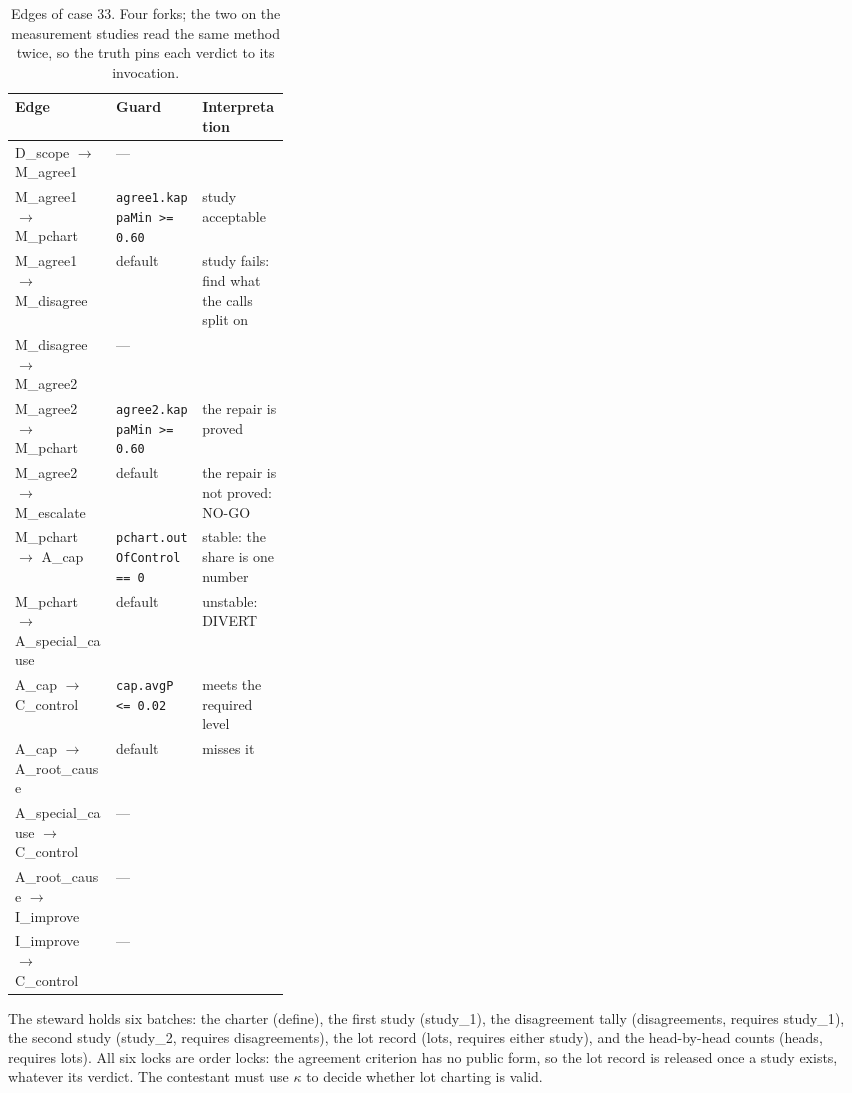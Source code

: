 \documentclass{article}
\begin{document}
\begin{table}[!htbp]
\caption{Edges of case 33. Four forks; the two on the measurement studies read the
same method twice, so the truth pins each verdict to its invocation.}
\label{tab:c33-edges}
\centering
\footnotesize
\begin{tabular}{@{}llP{0.32\linewidth}@{}}
\toprule
Edge & Guard & Interpretation \\
\midrule
D\_scope $\to$ M\_agree1             & ---                              & \\
M\_agree1 $\to$ M\_pchart            & \texttt{agree1.kappaMin >= 0.60} & study acceptable \\
M\_agree1 $\to$ M\_disagree          & default                          & study fails: find what the calls split on \\
M\_disagree $\to$ M\_agree2          & ---                              & \\
M\_agree2 $\to$ M\_pchart            & \texttt{agree2.kappaMin >= 0.60} & the repair is proved \\
M\_agree2 $\to$ M\_escalate          & default                          & the repair is not proved: NO-GO \\
M\_pchart $\to$ A\_cap               & \texttt{pchart.outOfControl == 0} & stable: the share is one number \\
M\_pchart $\to$ A\_special\_cause    & default                          & unstable: DIVERT \\
A\_cap $\to$ C\_control              & \texttt{cap.avgP <= 0.02}        & meets the required level \\
A\_cap $\to$ A\_root\_cause          & default                          & misses it \\
A\_special\_cause $\to$ C\_control & --- & \\
A\_root\_cause $\to$ I\_improve & --- & \\
I\_improve $\to$ C\_control & --- & \\
\bottomrule
\end{tabular}

\end{table}

The steward holds six batches: the charter ({define}), the first study
({study\_1}), the disagreement tally ({disagreements}, requires
{study\_1}), the second study ({study\_2}, requires
{disagreements}), the lot record ({lots}, requires either study), and the
head-by-head counts ({heads}, requires {lots}). All six locks are order
locks: the agreement criterion has no public form, so the lot record is released once a
study exists, whatever its verdict. The contestant must use $\kappa$ to decide whether lot charting is valid.
\end{document}
